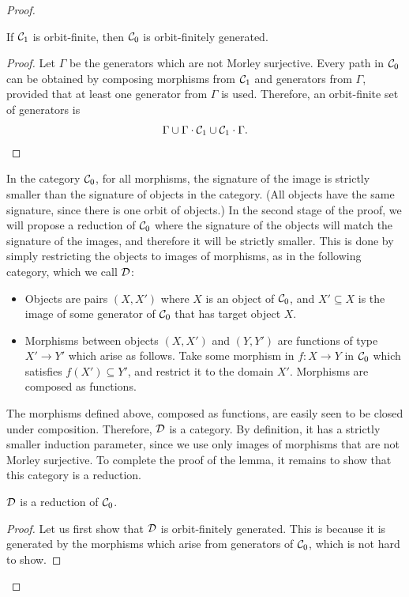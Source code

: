 \begin{proof}
    \begin{claim}
        If ${\mathcal C}_1$ is orbit-finite, then ${\mathcal C}_0$ is orbit-finitely generated.
    \end{claim}
    \begin{proof}
        Let $\Gamma$ be the generators which are not Morley surjective. 
        Every path in ${\mathcal C}_0$ can be obtained by composing morphisms from ${\mathcal C}_1$ and generators from $\Gamma$, provided that at least one generator from $\Gamma$ is used. Therefore, an orbit-finite set of generators is 
        \begin{align*}
        \Gamma \cup \Gamma \cdot {\mathcal C}_1 \cup {\mathcal C}_1 \cdot \Gamma.
        \end{align*}
    \end{proof}
    
    In the category ${\mathcal C}_0$, for all morphisms, the signature of the image is strictly smaller than the signature of objects in the category. (All objects have the same signature, since there is one orbit of objects.) In the second stage of the proof, we will propose a reduction of ${\mathcal C}_0$ where the signature of the objects will match the signature of the images, and therefore it will be strictly smaller.  This is done by simply restricting the objects to images of morphisms, as in the following category, which we call ${\mathcal D}$:
\begin{itemize}
    \item Objects are pairs $(X,X')$ where $X$ is an object of ${\mathcal C}_0$, and $X' \subseteq X$ is the image of some generator of ${\mathcal C}_0$ that has target object $X$.
    \item  Morphisms between objects $(X,X')$ and $(Y,Y')$ are functions of type $X' \to Y'$ which arise as follows. Take some morphism in $f : X \to Y$ in ${\mathcal C}_0$ which satisfies $f(X') \subseteq Y'$, and restrict it to the domain $X'$. Morphisms are composed as functions. 
\end{itemize} 
The morphisms defined above, composed as functions, are easily seen to be closed under composition. Therefore, ${\mathcal D}$ is a category. By definition, it has a strictly smaller induction parameter, since we use only images of morphisms that are not Morley surjective. To complete the proof of the lemma, it remains to show that this category is a reduction. 

\begin{claim}
    ${\mathcal D}$ is a reduction of ${\mathcal C}_0$.
\end{claim}
\begin{proof}
    Let us first show that ${\mathcal D}$ is orbit-finitely generated. This is because it is generated by the morphisms which arise from generators of ${\mathcal C}_0$, which is not hard to show.


\end{proof}
\end{proof}
